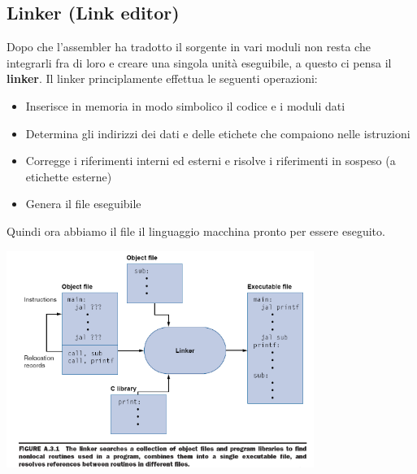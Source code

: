 \documentclass[12pt, a4paper, openany]{book}
\begin{document}
\subsection{Linker (Link editor)}
Dopo che l'assembler ha tradotto il sorgente in vari moduli non resta che integrarli
fra di loro e creare una singola unità eseguibile, a questo ci pensa il \textbf{linker}.
Il linker principlamente effettua le seguenti operazioni:\begin{itemize}
    \item Inserisce in memoria in modo simbolico il codice e i moduli dati
    \item Determina gli indirizzi dei dati e delle etichete che compaiono nelle istruzioni
    \item Corregge i riferimenti interni ed esterni e risolve i riferimenti in sospeso (a etichette esterne)
    \item Genera il file eseguibile
\end{itemize}
Quindi ora abbiamo il file il linguaggio macchina pronto per essere eseguito.
\begin{center}
    \includegraphics[width=100mm, scale=0.5]{linker.png}
\end{center}
\end{document}
